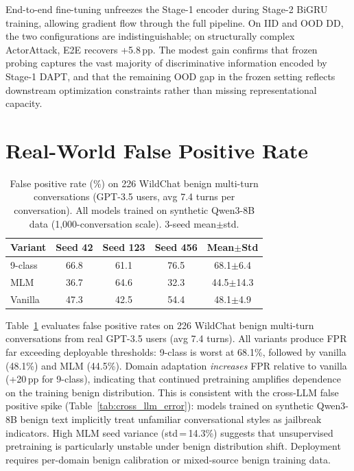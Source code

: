 End-to-end fine-tuning unfreezes the Stage-1 encoder during Stage-2 BiGRU training, allowing gradient flow through the full pipeline. On IID and OOD DD, the two configurations are indistinguishable; on structurally complex ActorAttack, E2E recovers +5.8\,pp. The modest gain confirms that frozen probing captures the vast majority of discriminative information encoded by Stage-1 DAPT, and that the remaining OOD gap in the frozen setting reflects downstream optimization constraints rather than missing representational capacity.

\section{Real-World False Positive Rate}
\label{app:wildchat_fpr}

\begin{table}[ht]
\centering
\footnotesize
\caption{False positive rate (\%) on 226 WildChat benign multi-turn conversations (GPT-3.5 users, avg 7.4 turns per conversation). All models trained on synthetic Qwen3-8B data (1{,}000-conversation scale). 3-seed mean$\pm$std.}
\label{tab:wildchat_fpr}
\begin{tabular}{@{}lcccc@{}}
\toprule
\textbf{Variant} & Seed 42 & Seed 123 & Seed 456 & Mean$\pm$Std \\
\midrule
9-class & 66.8 & 61.1 & 76.5 & 68.1$\pm$6.4 \\
MLM & 36.7 & 64.6 & 32.3 & 44.5$\pm$14.3 \\
Vanilla & 47.3 & 42.5 & 54.4 & 48.1$\pm$4.9 \\
\bottomrule
\end{tabular}
\end{table}

Table~\ref{tab:wildchat_fpr} evaluates false positive rates on 226 WildChat benign multi-turn conversations from real GPT-3.5 users (avg 7.4 turns). All variants produce FPR far exceeding deployable thresholds: 9-class is worst at 68.1\%, followed by vanilla (48.1\%) and MLM (44.5\%). Domain adaptation \emph{increases} FPR relative to vanilla (+20\,pp for 9-class), indicating that continued pretraining amplifies dependence on the training benign distribution. This is consistent with the cross-LLM false positive spike (Table~\ref{tab:cross_llm_error}): models trained on synthetic Qwen3-8B benign text implicitly treat unfamiliar conversational styles as jailbreak indicators. High MLM seed variance (std\,=\,14.3\%) suggests that unsupervised pretraining is particularly unstable under benign distribution shift. Deployment requires per-domain benign calibration or mixed-source benign training data.


